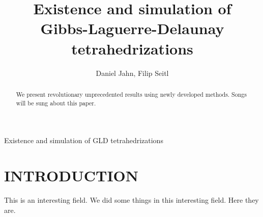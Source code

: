 \documentclass{kybernetika}
\begin{document}
\pagestyle{myheadings}




\title{Existence and simulation of \\ Gibbs-Laguerre-Delaunay tetrahedrizations} 

\author{Daniel Jahn, Filip Seitl}


 {Existence and simulation of GLD tetrahedrizations}

\maketitle

\begin{abstract}
We present revolutionary unprecedented results using newly developed methods. Songs will be sung about this paper. 
\end{abstract}



% 

\section{INTRODUCTION}
This is an interesting field. We did some things in this interesting field. Here they are.
\end{document}
